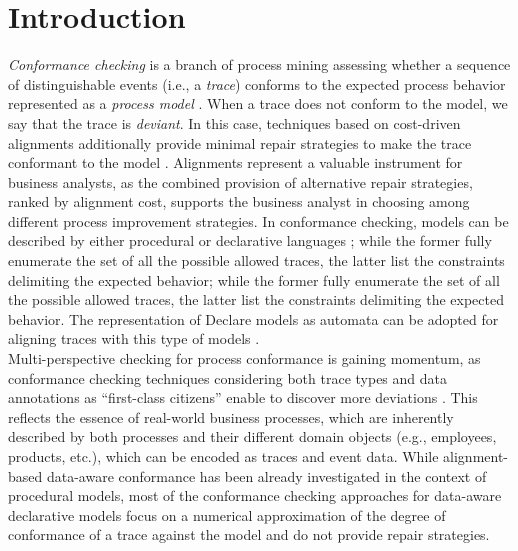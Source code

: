 \section{Introduction}
\label{sec:introduction}

\textit{Conformance checking} is a branch of process mining assessing whether a sequence of distinguishable events (i.e., a \textit{trace}) conforms to the expected process behavior represented as a \textit{process model} \cite{RozinatA08}. When a trace does not conform to the model, we say that the trace is \textit{deviant}. In this case, techniques based on cost-driven alignments additionally provide minimal repair strategies to make the trace conformant to the model \cite{DBLP:conf/edoc/AdriansyahDA11}. Alignments represent a valuable instrument for business analysts, as the combined provision of alternative repair strategies, ranked by alignment cost, supports the business analyst in choosing among different process improvement strategies. In conformance checking, models can be described by either procedural  or declarative languages ;  while the former fully enumerate the set of all the possible allowed traces, the latter list the constraints delimiting the expected behavior;  while the former fully enumerate the set of all the possible allowed traces, the latter %
list the constraints delimiting the expected behavior. %
%
The representation of Declare models as automata can be adopted for aligning traces with this type of models \cite{LeoniMA12,XuLZ17a}.
\\
\indent
Multi-perspective checking for process conformance is gaining momentum, as conformance checking techniques considering both trace types and data annotations as ``first-class citizens'' enable to discover more deviations \cite{MultiPerspective}. This reflects the essence of real-world business processes, which are inherently described by both processes and their different domain objects \cite{PetermannJMR14} (e.g., employees, products, etc.), which can be encoded as traces and event data. While alignment-based  data-aware conformance has been already investigated in the context of procedural models, most of the conformance checking approaches for data-aware declarative models \cite{BurattinMS16,Borrego014} focus on a numerical approximation of the degree of conformance of a trace against the model and do not provide repair strategies.

